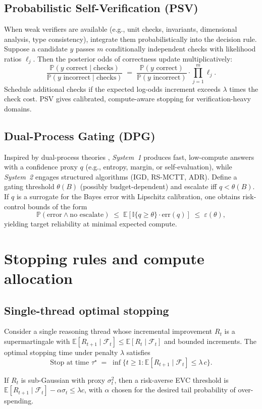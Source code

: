 \documentclass[11pt]{article}
\newcommand{\E}{\mathbb{E}}
\newcommand{\Prob}{\mathbb{P}}
\newcommand{\1}{\mathbb{I}}
\begin{document}
\subsection{Probabilistic Self-Verification (PSV)}

When weak verifiers are available (e.g., unit checks, invariants, dimensional analysis, type consistency), integrate them probabilistically into the decision rule. Suppose a candidate $y$ passes $m$ conditionally independent checks with likelihood ratios $\ell_j$. Then the posterior odds of correctness update multiplicatively:
\begin{equation}
\frac{\Prob(y \text{ correct}\mid \text{checks})}{\Prob(y \text{ incorrect}\mid \text{checks})}
\;=\; 
\frac{\Prob(y \text{ correct})}{\Prob(y \text{ incorrect})}
\cdot \prod_{j=1}^m \ell_j.
\end{equation}
Schedule additional checks if the expected log-odds increment exceeds $\lambda$ times the check cost. PSV gives calibrated, compute-aware stopping for verification-heavy domains.

\subsection{Dual-Process Gating (DPG)}

Inspired by dual-process theories \cite{kahneman2011}, \emph{System~1} produces fast, low-compute answers with a confidence proxy $q$ (e.g., entropy, margin, or self-evaluation), while \emph{System~2} engages structured algorithms (IGD, RS-MCTT, ADR).
Define a gating threshold $\theta(B)$ (possibly budget-dependent) and escalate iff $q < \theta(B)$.
If $q$ is a surrogate for the Bayes error with Lipschitz calibration, one obtains risk-control bounds of the form
\[
\Prob(\text{error}\wedge \text{no escalate}) \;\le\; \E[\1\{q \ge \theta\} \cdot \mathrm{err}(q)] \;\le\; \varepsilon(\theta),
\]
yielding target reliability at minimal expected compute.

\section{Stopping rules and compute allocation}

\subsection{Single-thread optimal stopping}
Consider a single reasoning thread whose incremental improvement $R_t$ is a supermartingale with $\E[R_{t+1}\mid \mathcal{F}_t] \le \E[R_t\mid \mathcal{F}_t]$ and bounded increments. The optimal stopping time under penalty $\lambda$ satisfies
\[
\text{Stop at time } \tau^\star \;=\; \inf\{ t \ge 1 : \E[R_{t+1}\mid \mathcal{F}_t] \le \lambda\, c\}.
\]
\begin{proposition}
If $R_t$ is sub-Gaussian with proxy $\sigma_t^2$, then a risk-averse EVC threshold is
$\E[R_{t+1}\mid \mathcal{F}_t] - \alpha \sigma_t \le \lambda c$,
with $\alpha$ chosen for the desired tail probability of over-spending.
\end{proposition}
\end{document}

